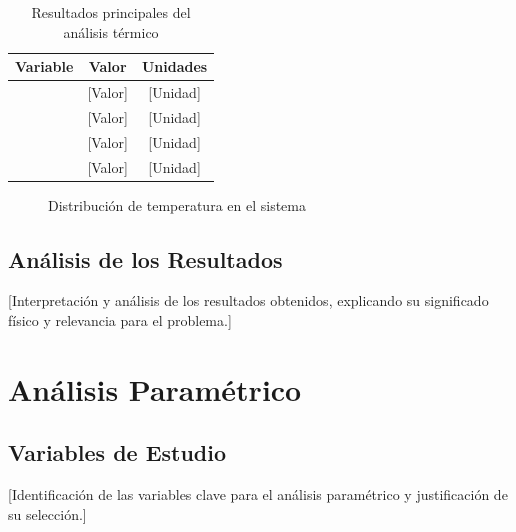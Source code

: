 \documentclass[12pt,letterpaper]{article}
\begin{document}
\begin{table}[H]
    \centering
    \caption{Resultados principales del análisis térmico}
    \label{tab:resultados_principales}
    \begin{tabular}{lcc}
        \toprule
        \textbf{Variable} & \textbf{Valor} & \textbf{Unidades} \\
        \midrule
        [Variable 1] & [Valor] & [Unidad] \\
        [Variable 2] & [Valor] & [Unidad] \\
        [Variable 3] & [Valor] & [Unidad] \\
        [Variable 4] & [Valor] & [Unidad] \\
        \bottomrule
    \end{tabular}
\end{table}

\begin{figure}[H]
    \centering
    \caption{Distribución de temperatura en el sistema}
    \label{fig:resultados_temperatura}
\end{figure}

\subsection{Análisis de los Resultados}
[Interpretación y análisis de los resultados obtenidos, explicando su significado físico y relevancia para el problema.]

\newpage
\section{Análisis Paramétrico}

\subsection{Variables de Estudio}
[Identificación de las variables clave para el análisis paramétrico y justificación de su selección.]
\end{document}
